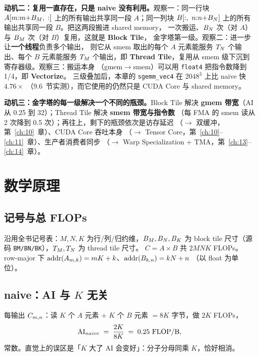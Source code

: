 \textbf{动机二：复用一直存在，只是 naive 没有利用。}观察一：同一行块
$A[m{:}m{+}B\sb{M},\ :]$ 上的所有输出共享同一段 $A$；同一列块
$B[:,\ n{:}n{+}B\sb{N}]$ 上的所有输出共享同一段 $B$。把这两段搬进 shared memory，
一次搬运、$B\sb{N}$ 次（对 $A$）与 $B\sb{M}$ 次（对 $B$）复用，这就是 \textbf{Block Tile}，
金字塔第一级。观察二：进一步让\textbf{一个线程}负责多个输出，
则它从 smem 取出的每个 $A$ 元素能服务 $T\sb{N}$ 个输出、每个 $B$ 元素能服务 $T\sb{M}$
个输出，即 \textbf{Thread Tile}，复用从 smem 级下沉到寄存器级。观察三：搬运本身
（gmem$\to$smem）可以用 \texttt{float4} 把指令数降到 1/4，即 \textbf{Vectorize}。
三级叠加后，本章的 \texttt{sgemm\_vec4} 在 $2048^3$ 上比 naive 快 $4.76\times$
（9.6~节实测），而它使用的仍然只是 CUDA Core 与 shared memory。

\textbf{动机三：金字塔的每一级解决一个不同的瓶颈。}\allowbreak{}Block Tile 解决
\textbf{gmem 带宽}（AI 从 0.25 到 32）；Thread Tile 解决 \textbf{smem 带宽与指令数}
（每 FMA 的 smem 读从 2 次降到 0.5 次）；再往上，剩下的瓶颈依次是访存延迟
（$\to$ 双缓冲，第~\ref{ch:10}~章）、CUDA Core 吞吐本身
（$\to$ Tensor Core，第~\ref{ch:10}--\ref{ch:11}~章）、生产者消费者同步
（$\to$ Warp Specialization + TMA，第~\ref{ch:13}--\ref{ch:14}~章）。

\section{数学原理}

\subsection{记号与总 FLOPs}

沿用全书记号表：$M, N, K$ 为行/列/归约维，$B\sb{M}, B\sb{N}, B\sb{K}$ 为 block tile
尺寸（源码 \texttt{BM/BN/BK}），$T\sb{M}, T\sb{N}$ 为 thread tile 尺寸。
$C = A \times B$ 共 $2MNK$ FLOPs。row-major 下
$\mathrm{addr}(A\sb{m,k}) = mK + k$、$\mathrm{addr}(B\sb{k,n}) = kN + n$
（以 float 为单位）。

\subsection{naive：AI 与 $K$ 无关}

每输出 $C\sb{m,n}$：读 $K$ 个 $A$ 元素 + $K$ 个 $B$ 元素 $= 8K$ 字节，做 $2K$ FLOPs，
\begin{equation}
  \mathrm{AI}\sb{naive} \;=\; \frac{2K}{8K} \;=\; 0.25 \ \text{FLOP/B},
  \label{eq:9-ai-naive}
\end{equation}
常数。直觉上的误区是「$K$ 大了 AI 会变好」：分子分母同乘 $K$，恰好相消。

